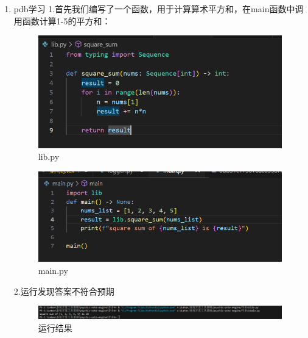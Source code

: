 \documentclass{ctexart}
\begin{document}
\begin{enumerate}
    \item pdb学习
    1.首先我们编写了一个函数，用于计算算术平方和，在main函数中调用函数计算1-5的平方和：
    \begin{figure}[H]
        \centering
        \includegraphics[width=12cm]{f4af56aefc982f41246adb38af28c064.png}
        \caption{lib.py}
        \label{fig:5}
        \end{figure}
     \begin{figure}[H]
        \centering
        \includegraphics[width=14cm]{14f60fcd64dc0bf5d36fb2a7a9dc5adb.png}
        \caption{main.py}
        \label{fig:6}
        \end{figure}   
    2.运行发现答案不符合预期
    \begin{figure}[H]
        \centering
        \includegraphics[width=14cm]{5fd6b435237099e54b69e634f0264935.png}
        \caption{运行结果}
        \label{fig:7}
        \end{figure}   


\end{enumerate}
\end{document}
